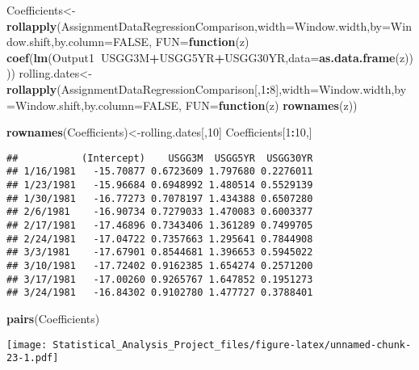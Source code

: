 \documentclass[]{article}
\newenvironment{Shaded}{\begin{snugshade}}{\end{snugshade}}
\newcommand{\KeywordTok}[1]{\textcolor[rgb]{0.13,0.29,0.53}{\textbf{#1}}}
\newcommand{\DataTypeTok}[1]{\textcolor[rgb]{0.13,0.29,0.53}{#1}}
\newcommand{\DecValTok}[1]{\textcolor[rgb]{0.00,0.00,0.81}{#1}}
\newcommand{\OtherTok}[1]{\textcolor[rgb]{0.56,0.35,0.01}{#1}}
\newcommand{\ControlFlowTok}[1]{\textcolor[rgb]{0.13,0.29,0.53}{\textbf{#1}}}
\newcommand{\OperatorTok}[1]{\textcolor[rgb]{0.81,0.36,0.00}{\textbf{#1}}}
\newcommand{\NormalTok}[1]{#1}
\begin{document}
\begin{Shaded}
\begin{Highlighting}[]
\NormalTok{Coefficients<-}\KeywordTok{rollapply}\NormalTok{(AssignmentDataRegressionComparison,}\DataTypeTok{width=}\NormalTok{Window.width,}\DataTypeTok{by=}\NormalTok{Window.shift,}\DataTypeTok{by.column=}\OtherTok{FALSE}\NormalTok{,}
         \DataTypeTok{FUN=}\ControlFlowTok{function}\NormalTok{(z) }\KeywordTok{coef}\NormalTok{(}\KeywordTok{lm}\NormalTok{(Output1}\OperatorTok{~}\NormalTok{USGG3M}\OperatorTok{+}\NormalTok{USGG5YR}\OperatorTok{+}\NormalTok{USGG30YR,}\DataTypeTok{data=}\KeywordTok{as.data.frame}\NormalTok{(z))))}
\NormalTok{rolling.dates<-}\KeywordTok{rollapply}\NormalTok{(AssignmentDataRegressionComparison[,}\DecValTok{1}\OperatorTok{:}\DecValTok{8}\NormalTok{],}\DataTypeTok{width=}\NormalTok{Window.width,}\DataTypeTok{by=}\NormalTok{Window.shift,}\DataTypeTok{by.column=}\OtherTok{FALSE}\NormalTok{,}
                         \DataTypeTok{FUN=}\ControlFlowTok{function}\NormalTok{(z) }\KeywordTok{rownames}\NormalTok{(z))}

\KeywordTok{rownames}\NormalTok{(Coefficients)<-rolling.dates[,}\DecValTok{10}\NormalTok{]}
\NormalTok{Coefficients[}\DecValTok{1}\OperatorTok{:}\DecValTok{10}\NormalTok{,]}
\end{Highlighting}
\end{Shaded}

\begin{verbatim}
##           (Intercept)    USGG3M  USGG5YR  USGG30YR
## 1/16/1981   -15.70877 0.6723609 1.797680 0.2276011
## 1/23/1981   -15.96684 0.6948992 1.480514 0.5529139
## 1/30/1981   -16.77273 0.7078197 1.434388 0.6507280
## 2/6/1981    -16.90734 0.7279033 1.470083 0.6003377
## 2/17/1981   -17.46896 0.7343406 1.361289 0.7499705
## 2/24/1981   -17.04722 0.7357663 1.295641 0.7844908
## 3/3/1981    -17.67901 0.8544681 1.396653 0.5945022
## 3/10/1981   -17.72402 0.9162385 1.654274 0.2571200
## 3/17/1981   -17.00260 0.9265767 1.647852 0.1951273
## 3/24/1981   -16.84302 0.9102780 1.477727 0.3788401
\end{verbatim}

\begin{Shaded}
\begin{Highlighting}[]
\KeywordTok{pairs}\NormalTok{(Coefficients)}
\end{Highlighting}
\end{Shaded}

\texttt{[image: Statistical\_Analysis\_Project\_files/figure-latex/unnamed-chunk-23-1.pdf]}
\end{document}
